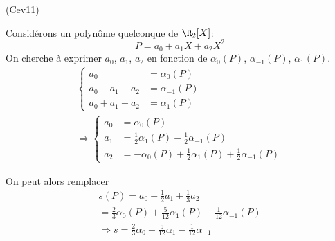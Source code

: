 \begin{tiny}(Cev11)\end{tiny} Considérons un polynôme quelconque de $\R_2[X]$:
\begin{displaymath}
  P =a_0 + a_1 X +a_2 X^2
\end{displaymath}
On cherche à exprimer $a_0$, $a_1$, $a_2$ en fonction de $\alpha_0(P)$, $\alpha_{-1}(P)$, $\alpha_{1}(P)$.
\begin{multline*}
\left\lbrace  
\begin{aligned}
  a_0 &= \alpha_0(P)\\
  a_0 - a_1 + a_2 &= \alpha_{-1}(P)\\
  a_0 + a_1 + a_2 &= \alpha_{1}(P)
\end{aligned}
\right. \\
\Rightarrow
\left\lbrace 
\begin{aligned}
  a_0 &= \alpha_0(P)\\
  a_1 &= \frac{1}{2}\alpha_1(P)-\frac{1}{2}\alpha_{-1}(P)\\
  a_2 &= -\alpha_0(P) + \frac{1}{2}\alpha_1(P)+\frac{1}{2}\alpha_{-1}(P)
\end{aligned}
\right. 
\end{multline*}

On peut alors remplacer
\begin{multline*}
  s(P) = a_0 + \frac{1}{2}a_1+\frac{1}{3}a_2 \\
  = \frac{2}{3}\alpha_0(P) + \frac{5}{12}\alpha_{1}(P) - \frac{1}{12}\alpha_{-1}(P) \\
\Rightarrow
s  = \frac{2}{3}\alpha_0 + \frac{5}{12}\alpha_{1} - \frac{1}{12}\alpha_{-1}
\end{multline*}

